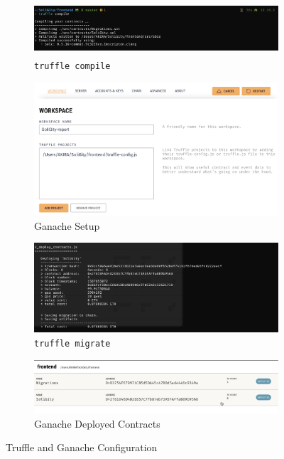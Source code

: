 \documentclass[12pt]{article}
\renewcommand{\_}{\kern-1.5pt\textunderscore\kern-1.5pt}
\begin{document}
\begin{figure}[H]
	\centering
	\begin{subfigure}[b]{.45\textwidth}
		\centering
	\includegraphics[height=2cm]{graphs/05. truffle_compile}
	\caption{\texttt{truffle compile}}
	\end{subfigure}
	\begin{subfigure}[b]{.45\textwidth}
		\centering
		\includegraphics[width=13cm]{graphs/06. ganache_setup}
	\caption{Ganache Setup}
	\end{subfigure}
	\hspace{1em}
	\begin{subfigure}[b]{.45\textwidth}
		\centering
	\includegraphics[width=13cm]{graphs/07. truffle_migrate}
	\caption{\texttt{truffle migrate}}
	\end{subfigure}
		\begin{subfigure}[b]{.45\textwidth}
		\centering
	\includegraphics[width=13cm]{graphs/08. ganache_deployed_contract}
	\caption{Ganache Deployed Contracts}
	\end{subfigure}
	\caption{Truffle and Ganache Configuration}
\end{figure}
\end{document}
